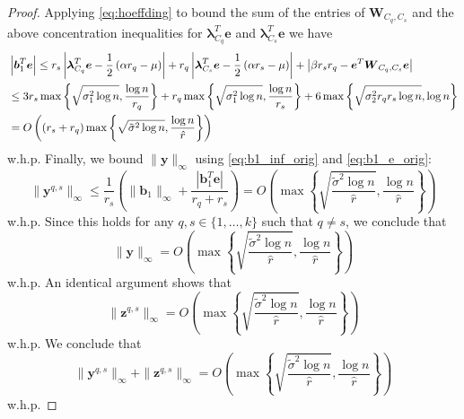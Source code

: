 \documentclass[twoside,11pt]{article}
\DeclareMathOperator{\pr}{Pr}
\newcommand{\e}{\bs {e}}
\newcommand{\bs}{\boldsymbol}
\newcommand{\0}{\bs{0}}
\newcommand{\rbra}[1]{\ensuremath{\left( #1 \right)}} %
\newcommand{\bra}[1]{\ensuremath{\left\{ #1 \right\}}} %
\begin{document}
{\begin{proof}
Applying \eqref{eq:hoeffding} to bound the sum of the entries of
$\bs{W}_{C_q,C_s}$ and the above concentration inequalities
for $\bs{\lambda}_{C_q}^T \e$ and $\bs{\lambda}_{C_s}^T \e$
we have
\begin{align} 
	& \left|\bs{b}_1^T \bs{e}\right| 
		\leq r_s \left|\bs{\lambda}_{C_q}^T \bs{e} - \frac{1}
		{2}\left(\alpha r_q - \mu \right)\right| 
		+ r_q\left|\bs{\lambda}_{C_s}^T \bs{e} 
		- \frac{1}{2}\left(\alpha r_s - \mu\right)\right| 
		+ \left|\beta r_s r_q - \bs{e}^T \bs{W}_{C_q,C_s}\bs{e}\right| 
		\notag \\
		& \leq 3 r_s \max\bra{ \sqrt{\sigma_1^2 \log n}, 
			\frac{\log n}{r_q} } 
			+ r_q \max\bra{ \sqrt{\sigma_1^2 \log n},
			\frac{\log n}{r_s} } 
			+  6 \max \bra{ \sqrt{\sigma_2^2 r_q r_s \log n}, \log n} 
		\notag \\
		& = O \rbra{ (r_s + r_q) \max\bra{ \sqrt{\tilde \sigma^2 \log n}, 
			\frac{\log n}{\hat r} }  }\label{eq:b1_e_orig}
\end{align}
w.h.p. 
Finally, we bound $\|\bs{y}\|_{\infty}$  using \eqref{eq:b1_inf_orig} and \eqref{eq:b1_e_orig}:
$$
	\|\bs{y}^{q,s}\|_{\infty} 
	\leq \frac{1}{r_s}\left( \|\bs{b}_1\|_{\infty} 
		+ \frac{|\bs{b}_1^T \bs{e}|}{r_q +r_s}\right) 
	= O \rbra{ \max \bra{  \sqrt{ \frac{ \tilde{\sigma}^2 \log n}{\hat{r}} },
		\frac{ \log n}{\hat{r}} } } 
$$
w.h.p. Since this holds for any $q,s \in\{1,\dots,k\}$ such that $q \neq s$, we conclude that 
\begin{equation}
\label{eq:y_bound_orig}
\|\bs{y}\|_{\infty} = O \rbra{ \max \bra{  \sqrt{ \frac{ \tilde{\sigma}^2 \log n}{\hat{r}} },
		\frac{ \log n}{\hat{r}} } } 
\end{equation}
w.h.p.
An identical argument shows that
\begin{equation}
\label{eq:z_bound_orig}
	\|\bs{z}^{q,s}\|_{\infty} 
	= O \rbra{ \max \bra{  \sqrt{ \frac{ \tilde{\sigma}^2 \log n}{\hat{r}} },
		\frac{ \log n}{\hat{r}} } } 
\end{equation}
w.h.p. 
We conclude that
\begin{equation}
\label{eq:lemma42_known_c}
	\|\bs{y}^{q,s}\|_{\infty} +  \|\bs{z}^{q,s}\|_{\infty}
	= O \rbra{ \max \bra{  \sqrt{ \frac{ \tilde{\sigma}^2 \log n}{\hat{r}} },
		\frac{ \log n}{\hat{r}} } } 
\end{equation}
w.h.p.
\end{proof}

}
\end{document}
